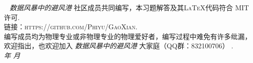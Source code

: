 \documentclass[12pt,a4paper]{ctexbook}
\title{\huge \heiti{高显经典力学习题解答}}
\author{ \ttfamily \texttt \Large 数据风暴中的避风港\\}
\date{\large \today}
\begin{document}
\maketitle

\pagestyle{fancy}
\fancyhf{}
\fancyhead{}
~\vfill
\noindent \textit{数据风暴中的避风港 }\textsc{ 社区成员共同编写，本习题解答及其\LaTeX 代码符合 MIT 许可.}\\

\noindent \textsc{链接：https://github.com/Phiyu/GaoXian.}\\

\noindent \textsc{编写成员均为物理专业或非物理专业的物理爱好者，编写过程中难免有许多纰漏，欢迎指出，也欢迎加入}
\textit{ 数据风暴中的避风港 } 
\textsc{大家庭（QQ群：832100706） .}\\

\noindent \textit{\number\year 年 \number\month 月} %

\tableofcontents

\newpage
\pagestyle{fancy}
\fancyhf{} 
\fancyhead[LE]{\kaishu \leftmark}
\fancyhead[RO]{\kaishu \leftmark}
\cfoot{\thepage}

\setcounter{page}{1}

\setcounter{problem}{0}
\newpage


\setcounter{problem}{0}
\newpage 


\newpage


\newpage 


\newpage


\newpage 


\newpage


\newpage 


\newpage


\newpage 


\newpage


\newpage 


\newpage


\newpage 


\newpage


\newpage 


\newpage

\end{document}
